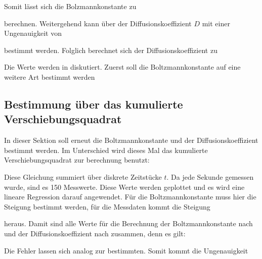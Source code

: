 
Somit lässt sich die Bolzmannkonstante zu


berechnen. Weitergehend kann über  der Diffusionskoeffizient $D$ mit einer Ungenauigkeit von


bestimmt werden. Folglich berechnet sich der Diffusionskoeffizient zu


Die Werte werden in  diskutiert. Zuerst soll die Boltzmannkonstante auf eine weitere Art bestimmt werden

\subsection{Bestimmung über das kumulierte Verschiebungsquadrat}
\label{ssec:kumulierte}
In dieser Sektion soll erneut die Boltzmannkonstante und der Diffusionskoeffizient bestimmt werden. Im Unterschied wird dieses Mal das kumulierte Verschiebungsquadrat zur berechnung benutzt:


Diese Gleichung summiert über diskrete Zeitstücke $t$. Da jede Sekunde gemessen wurde, sind es 150 Messwerte.
Diese Werte werden geplottet und es wird eine lineare Regression darauf angewendet. Für die Boltzmannkonstante muss hier die Steigung bestimmt werden, für die Messdaten kommt die Steigung


heraus. Damit sind alle Werte für die Berechnung der Boltzmannkonstante nach  und der Diffusionskoeffizient nach  zusammen, denn es gilt:



Die Fehler lassen sich analog zur  bestimmten. Somit kommt die Ungenauigkeit

